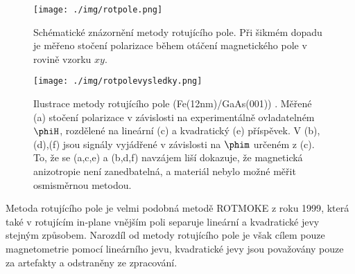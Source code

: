 \begin{figure}\center
\texttt{[image: ./img/rotpole.png]}
\caption{Schématické znázornění metody rotujícího pole\cite{rotpole2}. Při šikmém dopadu je měřeno stočení polarizace během otáčení magnetického pole v rovině vzorku $xy$.}\label{f:rotujici pole}
\end{figure}

\begin{figure}
    \centering
    \texttt{[image: ./img/rotpolevysledky.png]}
    \caption{Ilustrace metody rotujícího pole (Fe(12nm)/GaAs(001)) \cite{rotpole2}.
    Měřené (a) stočení polarizace v závislosti na experimentálně ovladatelném $\phiH$, rozdělené na lineární (c) a kvadratický (e) příspěvek. V (b),(d),(f) jsou signály vyjádřené v závislosti na $\phim$ určeném z (c). To, že se (a,c,e) a (b,d,f) navzájem liší dokazuje, že magnetická anizotropie není zanedbatelná, a materiál nebylo možné měřit osmisměrnou metodou.}
    \label{f:rotpolevysledky}
\end{figure}

Metoda rotujícího pole je velmi podobná metodě ROTMOKE z roku 1999\cite{ROTMOKE}, která také v rotujícím in-plane vnějším poli separuje lineární a kvadratické jevy stejným způsobem.
Narozdíl od metody rotujícího pole je však cílem pouze magnetometrie pomocí lineárního jevu, kvadratické jevy jsou považovány pouze za artefakty a odstraněny ze zpracování.